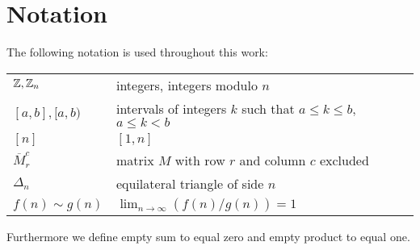 \chapter*{Notation}

The following notation is used throughout this work:
\bigskip

\noindent
\begin{tabularx}{\linewidth}{l X}
	$\mathbb Z, \mathbb Z_n$ & integers, integers modulo $n$ \\
	$[a,b], [a,b)$ & intervals of integers $k$ such that $a \leq k \leq b$, $a \leq k < b$ \\
	$[n]$ & $[1,n]$ \\
	$\overbar{M}_r^c$ & matrix $M$ with row $r$ and column $c$ excluded \\
	$\Delta_n$ & equilateral triangle of side $n$ \\
	$f(n) \sim g(n)$ & $\lim_{n \rightarrow \infty} (f(n)/g(n)) = 1$ \\
\end{tabularx}
\bigskip 

\noindent
Furthermore we define empty sum to equal zero and empty product to equal one.
